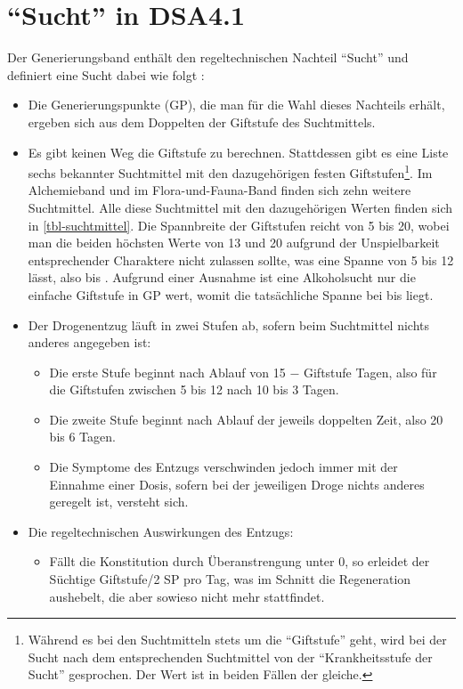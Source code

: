 \section{\enquote{Sucht} in DSA4.1}
Der Generierungsband  enthält den regeltechnischen Nachteil \enquote{Sucht} und definiert eine Sucht dabei wie folgt \cite[S.~271]{WdH}:

\begin{itemize}
	\item Die Generierungspunkte (GP), die man für die Wahl dieses Nachteils erhält, ergeben sich aus dem Doppelten der Giftstufe des Suchtmittels.
	\item Es gibt keinen Weg die Giftstufe zu berechnen. Stattdessen gibt es eine Liste sechs bekannter Suchtmittel mit den dazugehörigen festen Giftstufen\footnote{Während es bei den Suchtmitteln stets um die \enquote{Giftstufe} geht, wird bei der Sucht nach dem entsprechenden Suchtmittel von der \enquote{Krankheitsstufe der Sucht} gesprochen. Der Wert ist in beiden Fällen der gleiche.}. Im Alchemieband  und im Flora-und-Fauna-Band  finden sich zehn weitere Suchtmittel. Alle diese Suchtmittel mit den dazugehörigen Werten finden sich in \vref{tbl-suchtmittel}. Die Spannbreite der Giftstufen reicht von 5 bis 20, wobei man die beiden höchsten Werte von 13 und 20 aufgrund der Unspielbarkeit entsprechender Charaktere nicht zulassen sollte, was eine Spanne von 5 bis 12 lässt, also  bis . Aufgrund einer Ausnahme ist eine Alkoholsucht nur die einfache Giftstufe in GP wert, womit die tatsächliche Spanne bei  bis  liegt.
	\item Der Drogenentzug läuft in zwei Stufen ab, sofern beim Suchtmittel nichts anderes angegeben ist:
		\begin{itemize}
			\item Die erste Stufe beginnt nach Ablauf von 15 − Giftstufe Tagen, also für die Giftstufen zwischen 5 bis 12 nach 10 bis 3 Tagen.
			\item Die zweite Stufe beginnt nach Ablauf der jeweils doppelten Zeit, also 20 bis 6 Tagen.
			\item Die Symptome des Entzugs verschwinden jedoch immer mit der Einnahme einer Dosis, sofern bei der jeweiligen Droge nichts anderes geregelt ist, versteht sich.
		\end{itemize}
	\item Die regeltechnischen Auswirkungen des Entzugs:
		\begin{itemize}
			\item Fällt die Konstitution durch Überanstrengung unter 0, so erleidet der Süchtige Giftstufe/2 SP pro Tag, was im Schnitt die Regeneration aushebelt, die aber sowieso nicht mehr stattfindet.

\end{itemize}
\end{itemize}
